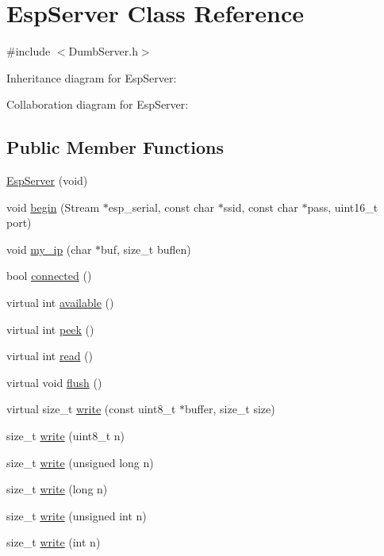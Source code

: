 \hypertarget{class_esp_server}{}\section{Esp\+Server Class Reference}
\label{class_esp_server}


{\ttfamily \#include $<$Dumb\+Server.\+h$>$}



Inheritance diagram for Esp\+Server\+:


Collaboration diagram for Esp\+Server\+:
\subsection*{Public Member Functions}
\begin{DoxyCompactItemize}
\item 
\mbox{\hyperlink{class_esp_server_afcdc76f5ca68d5049657e5d9d971a1c3}{Esp\+Server}} (void)
\item 
void \mbox{\hyperlink{class_esp_server_a1d032e732d4733905d676ef016fcd43c}{begin}} (Stream $\ast$esp\+\_\+serial, const char $\ast$ssid, const char $\ast$pass, uint16\+\_\+t port)
\item 
void \mbox{\hyperlink{class_esp_server_a55995fd6398892be5768da85dde4f533}{my\+\_\+ip}} (char $\ast$buf, size\+\_\+t buflen)
\item 
bool \mbox{\hyperlink{class_esp_server_a6a25e008ded89de0e4599df7170008fb}{connected}} ()
\item 
virtual int \mbox{\hyperlink{class_esp_server_aad68b4972f6b8426004feeef6e98d02d}{available}} ()
\item 
virtual int \mbox{\hyperlink{class_esp_server_a005a9cd487f4ccb4ccef72197bf263b7}{peek}} ()
\item 
virtual int \mbox{\hyperlink{class_esp_server_ae47512714818b3b9a1d29d2bf1f70fdf}{read}} ()
\item 
virtual void \mbox{\hyperlink{class_esp_server_a05062a3ac7c70a79e991b66789384bf1}{flush}} ()
\item 
virtual size\+\_\+t \mbox{\hyperlink{class_esp_server_a0756c42343195dd1d1aa2f61c9b095bf}{write}} (const uint8\+\_\+t $\ast$buffer, size\+\_\+t size)
\item 
size\+\_\+t \mbox{\hyperlink{class_esp_server_aecc7262ee265fd78affe24f35e49e1bb}{write}} (uint8\+\_\+t n)
\item 
size\+\_\+t \mbox{\hyperlink{class_esp_server_ae3ba71ceb4df9357d8e258efe3e79f4d}{write}} (unsigned long n)
\item 
size\+\_\+t \mbox{\hyperlink{class_esp_server_ac256a11ccc8d32664729a7f5bfc71add}{write}} (long n)
\item 
size\+\_\+t \mbox{\hyperlink{class_esp_server_afde7c57b12659422147d9a5e56b76148}{write}} (unsigned int n)
\item 
size\+\_\+t \mbox{\hyperlink{class_esp_server_a2a49890c886a2b0569b11e02f986f867}{write}} (int n)
\end{DoxyCompactItemize}


